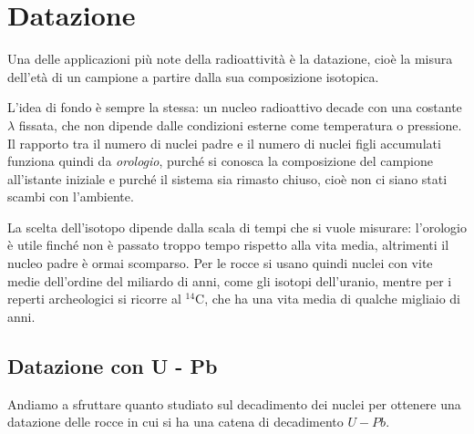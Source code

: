 \restoregeometry

\chapter{Datazione}

Una delle applicazioni più note della radioattività è la datazione, cioè la misura dell'età di un campione a partire dalla sua composizione isotopica. 

L'idea di fondo è sempre la stessa: un nucleo radioattivo decade con una costante $\lambda$ fissata, che non dipende dalle condizioni esterne come temperatura o pressione. Il rapporto tra il numero di nuclei padre e il numero di nuclei figli accumulati funziona quindi da \emph{orologio}, purché si conosca la composizione del campione all'istante iniziale e purché il sistema sia rimasto chiuso, cioè non ci siano stati scambi con l'ambiente. 

La scelta dell'isotopo dipende dalla scala di tempi che si vuole misurare: l'orologio è utile finché non è passato troppo tempo rispetto alla vita media, altrimenti il nucleo padre è ormai scomparso. Per le rocce si usano quindi nuclei con vite medie dell'ordine del miliardo di anni, come gli isotopi dell'uranio, mentre per i reperti archeologici si ricorre al $^{14}\mathrm{C}$, che ha una vita media di qualche migliaio di anni.\\

\section{Datazione con U - Pb}

Andiamo a sfruttare quanto studiato sul decadimento dei nuclei per ottenere una datazione delle rocce in cui si ha una catena di decadimento $U - Pb$.

